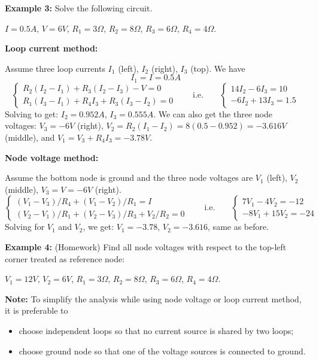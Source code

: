 {\bf Example 3:} Solve the following circuit.


$I=0.5 A$, $V=6 V$, $R_1=3\Omega$, $R_2=8\Omega$, $R_3=6\Omega$, $R_4=4\Omega$.

{\bf Loop current method:}

Assume three loop currents $I_1$ (left), $I_2$ (right), $I_3$ (top). We have
\[ I_1=I=0.5A \]
\[ \left\{ \begin{array}{l}
  R_2(I_2-I_1)+R_3(I_2-I_3)-V=0 \\
  R_1(I_3-I_1)+R_4I_3+R_3(I_3-I_2)=0 \end{array} \right. 
  \;\;\;\;\;\;\;\mbox{i.e.}\;\;\;\;\;\;\;
  \left\{ \begin{array}{l}
  14 I_2-6 I_3=10 \\
  -6 I_2+13 I_3=1.5 \end{array} \right. \]
Solving to get: $I_2=0.952 A$, $I_3=0.555 A$. We can also get the three node
voltages: $V_3=-6V$ (right), $V_2=R_2(I_1-I_2)=8(0.5-0.952)=-3.616V$ (middle),
and $V_1=V_3+R_4 I_3=-3.78 V$. 

{\bf Node voltage method:}

Assume the bottom node is ground and the three node voltages are $V_1$ (left),
$V_2$ (middle), $V_3=V=-6V$ (right). 
\[ \left\{ \begin{array}{l}
  (V_1-V_3)/R_4+(V_1-V_2)/R_1=I \\
  (V_2-V_1)/R_1+(V_2-V_3)/R_3+V_2/R_2=0 \end{array} \right. 
  \;\;\;\;\;\;\;\mbox{i.e.}\;\;\;\;\;\;\;
  \left\{ \begin{array}{l}
  7V_1-4V_2=-12 \\
  -8V_1+15V_2=-24 \end{array} \right. \]
Solving for $V_1$ and $V_2$, we get: $V_1=-3.78$, $V_2=-3.616$, same as before.

{\bf Example 4:} (Homework) Find all node voltages with respect to the top-left
corner treated as reference node:


$V_1=12 V$, $V_2=6 V$, $R_1=3 \Omega$, $R_2=8 \Omega$, $R_3=6 \Omega$, $R_4=4\Omega$.


{\bf Note:} To simplify the analysis while using node voltage or loop current 
method, it is preferable to
\begin{itemize}
  \item choose independent loops so that no current source is shared by two 
    loops;
  \item choose ground node so that one of the voltage sources is connected
    to ground.
\end{itemize}

